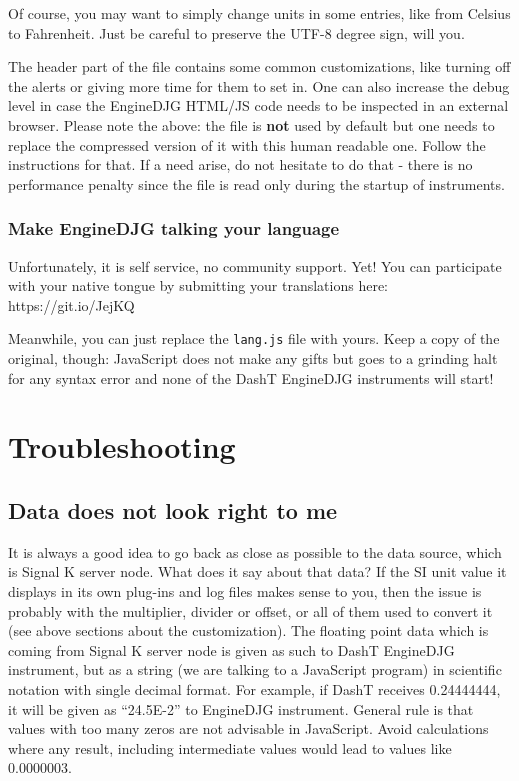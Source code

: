 \documentclass[11pt]{article}
\begin{document}
    Of course, you may want to simply change units in some entries, like
from Celsius to Fahrenheit. Just be careful to preserve the UTF-8 degree
sign, will you.

    The header part of the file contains some common customizations, like
turning off the alerts or giving more time for them to set in. One can
also increase the debug level in case the EngineDJG HTML/JS code needs
to be inspected in an external browser. Please note the above: the file
is \textbf{not} used by default but one needs to replace the compressed
version of it with this human readable one. Follow the instructions for
that. If a need arise, do not hesitate to do that - there is no
performance penalty since the file is read only during the startup of
instruments.

    \hypertarget{make-enginedjg-talking-your-language}{%
\subsubsection{Make EngineDJG talking your
language}\label{make-enginedjg-talking-your-language}}

    Unfortunately, it is self service, no community support. Yet! You can
participate with your native tongue by submitting your translations
here: https://git.io/JejKQ

    Meanwhile, you can just replace the \texttt{lang.js} file with yours.
Keep a copy of the original, though: JavaScript does not make any gifts
but goes to a grinding halt for any syntax error and none of the DashT
EngineDJG instruments will start!

    \hypertarget{troubleshooting}{%
\section{Troubleshooting}\label{troubleshooting}}

    \hypertarget{data-does-not-look-right-to-me}{%
\subsection{Data does not look right to
me}\label{data-does-not-look-right-to-me}}

    It is always a good idea to go back as close as possible to the data
source, which is Signal K server node. What does it say about that data?
If the SI unit value it displays in its own plug-ins and log files makes
sense to you, then the issue is probably with the multiplier, divider or
offset, or all of them used to convert it (see above sections about the
customization). The floating point data which is coming from Signal K
server node is given as such to DashT EngineDJG instrument, but as a
string (we are talking to a JavaScript program) in scientific notation
with single decimal format. For example, if DashT receives 0.24444444,
it will be given as ``24.5E-2'' to EngineDJG instrument. General rule is
that values with too many zeros are not advisable in JavaScript. Avoid
calculations where any result, including intermediate values would lead
to values like 0.0000003.
\end{document}
